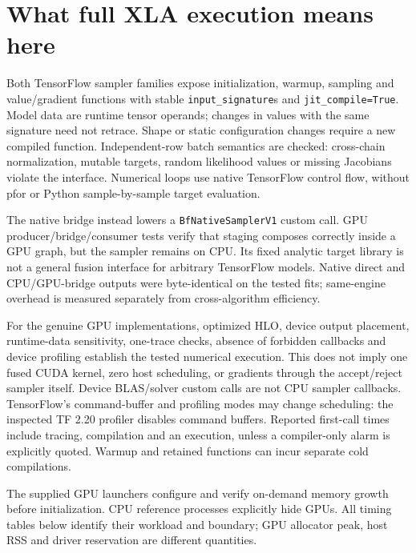 \section{What full XLA execution means here}
\label{sec:sw-xla}

Both TensorFlow sampler families expose initialization, warmup, sampling
and value/gradient functions with stable \texttt{input\_signature}s
and \texttt{jit\_compile=True}. Model data are runtime tensor operands;
changes in values with the same signature need not retrace. Shape or static
configuration changes require a new compiled function. Independent-row
batch semantics are checked: cross-chain normalization, mutable targets,
random likelihood values or missing Jacobians violate the interface.
Numerical loops use native TensorFlow control flow, without pfor or Python
sample-by-sample target evaluation.

The native bridge instead lowers a \texttt{BfNativeSamplerV1} custom call.
GPU producer/bridge/consumer tests verify that staging composes correctly
inside a GPU graph, but the sampler remains on CPU. Its fixed analytic
target library is not a general fusion interface for arbitrary TensorFlow
models. Native direct and CPU/GPU-bridge outputs were byte-identical on
the tested fits; same-engine overhead is measured separately from
cross-algorithm efficiency.

For the genuine GPU implementations, optimized HLO, device output placement,
runtime-data sensitivity, one-trace checks, absence of forbidden callbacks
and device profiling establish the tested numerical execution. This does
not imply one fused CUDA kernel, zero host scheduling, or gradients through
the accept/reject sampler itself. Device BLAS/solver custom calls are not
CPU sampler callbacks. TensorFlow's command-buffer and profiling modes may
change scheduling: the inspected TF 2.20 profiler disables command buffers.
Reported first-call times include tracing, compilation and an execution,
unless a compiler-only alarm is explicitly quoted. Warmup and retained
functions can incur separate cold compilations.

The supplied GPU launchers configure and verify on-demand memory growth
before initialization. CPU reference processes explicitly hide GPUs.
All timing tables below identify their workload and boundary; GPU allocator
peak, host RSS and driver reservation are different quantities.




\clearpage
\endgroup
